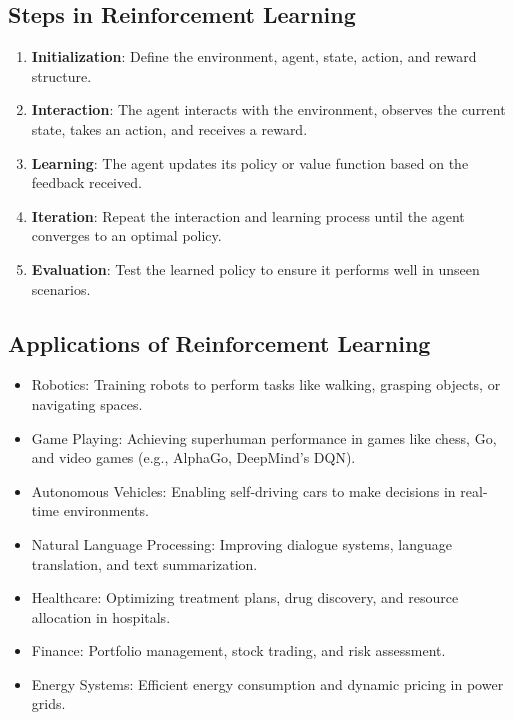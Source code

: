 \subsection*{Steps in Reinforcement Learning}

\begin{enumerate}
    \item \textbf{Initialization}:
    Define the environment, agent, state, action, and reward structure.
    \item \textbf{Interaction}:
    The agent interacts with the environment, observes the current state, takes an action, and receives a reward.
    \item \textbf{Learning}:
    The agent updates its policy or value function based on the feedback received.
    \item \textbf{Iteration}:
    Repeat the interaction and learning process until the agent converges to an optimal policy.
    \item \textbf{Evaluation}:
    Test the learned policy to ensure it performs well in unseen scenarios.
\end{enumerate}

\subsection*{Applications of Reinforcement Learning}

\begin{itemize}
    \item Robotics: Training robots to perform tasks like walking, grasping objects, or navigating spaces.
    \item Game Playing: Achieving superhuman performance in games like chess, Go, and video games (e.g., AlphaGo, DeepMind’s DQN).
    \item Autonomous Vehicles: Enabling self-driving cars to make decisions in real-time environments.
    \item Natural Language Processing: Improving dialogue systems, language translation, and text summarization.
    \item Healthcare: Optimizing treatment plans, drug discovery, and resource allocation in hospitals.
    \item Finance: Portfolio management, stock trading, and risk assessment.
    \item Energy Systems: Efficient energy consumption and dynamic pricing in power grids.
\end{itemize}

